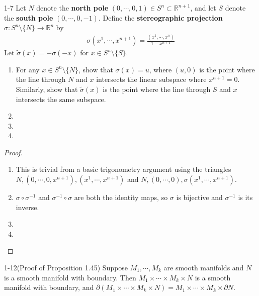 \begin{customprob}{1-7}
  Let $N$ denote the \textbf{north pole} $(0, \cdots, 0, 1) \in S^n \subset \mathbb{R}^{n + 1}$, and let $S$ denote the \textbf{south pole} $(0, \cdots, 0, -1)$.
  Define the \textbf{stereographic projection} $\sigma: S^n \setminus \{ N \} \rightarrow \mathbb{R}^n$ by
  \begin{align*}
    \sigma(x^1, \cdots, x^{n + 1}) = \frac{(x^1, \cdots, x^n)}{1 - x^{n + 1}}
  \end{align*}
  Let $\tilde{\sigma}(x) = -\sigma(-x)$ for $x \in S^n \setminus \{ S \}$.
  \begin{enumerate}[label=(\alph*)]
    \item 
      For any $x \in S^n \setminus \{ N \}$, show that $\sigma(x) = u$, where $(u, 0)$ is the point where the line through $N$ and $x$ intersects the linear subspace where $x^{n + 1} = 0$.
      Similarly, show that $\tilde{\sigma}(x)$ is the point where the line through $S$ and $x$ intersects the same subspace.
    \item
    \item
    \item
  \end{enumerate}
\end{customprob}

\begin{proof}
  $ $
  \begin{enumerate}[label=(\alph*)]
    \item 
      This is trivial from a basic trigonometry argument using the triangles $N, (0, \cdots, 0, x^{n + 1}), (x^1, \cdots, x^{n + 1})$ and $N, (0, \cdots, 0), \sigma(x^1, \cdots, x^{n + 1})$.
    \item
      $\sigma \circ \sigma^{-1}$ and $\sigma^{-1} \circ \sigma$ are both the identity maps, so $\sigma$ is bijective and $\sigma^{-1}$ is its inverse.
    \item
    \item
  \end{enumerate}
\end{proof}

\begin{customprob}{1-12(Proof of Proposition 1.45)}
  Suppose $M_1, \cdots, M_k$ are smooth manifolds and $N$ is a smooth manifold with boundary.
  Then $M_1 \times \cdots \times M_k \times N$ is a smooth manifold with boundary, and $\partial (M_1 \times \cdots \times M_k \times N) = M_1 \times \cdots \times M_k \times \partial N$.
\end{customprob}

